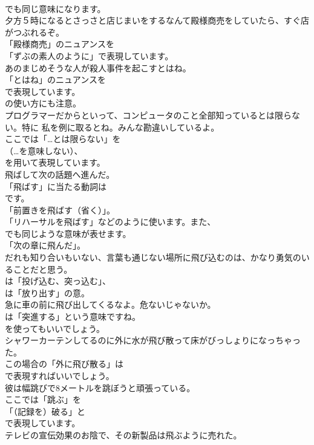 \documentclass[8pt]{extreport}
\begin{document}
\begin{CJK}{UTF8}{min}
\\	でも同じ意味になります。	
\\	夕方５時になるとさっさと店じまいをするなんて殿様商売をしていたら、すぐ店がつぶれるぞ。 
\\	「殿様商売」のニュアンスを
\\	「ずぶの素人のように」で表現しています。	
\\	あのまじめそうな人が殺人事件を起こすとはね。 
\\	「とはね」のニュアンスを 
\\	で表現しています。
\\	の使い方にも注意。	
\\	プログラマーだからといって、コンピュータのこと全部知っているとは限らない。特に 私を例に取るとね。みんな勘違いしているよ。 
\\	ここでは「…とは限らない」を 
\\	（…を意味しない）、
\\	を用いて表現しています。	
\\	飛ばして次の話題へ進んだ。 
\\	「飛ばす」に当たる動詞は
\\	です。
\\	「前置きを飛ばす（省く）」。
\\	「リハーサルを飛ばす」などのように使います。また、
\\	でも同じような意味が表せます。
\\	「次の章に飛んだ」。	
\\	だれも知り合いもいない、言葉も通じない場所に飛び込むのは、かなり勇気のいることだと思う。 
\\	は「投げ込む、突っ込む」、
\\	は「放り出す」の意。	
\\	急に車の前に飛び出してくるなよ。危ないじゃないか。 
\\	は「突進する」という意味ですね。
\\	を使ってもいいでしょう。	
\\	シャワーカーテンしてるのに外に水が飛び散って床がびっしょりになっちゃった。 
\\	この場合の「外に飛び散る」は 
\\	で表現すればいいでしょう。	
\\	彼は幅跳びで8メートルを跳ぼうと頑張っている。 
\\	ここでは「跳ぶ」を 
\\	「（記録を）破る」と 
\\	で表現しています。	
\\	テレビの宣伝効果のお陰で、その新製品は飛ぶように売れた。 

\end{CJK}
\end{document}
